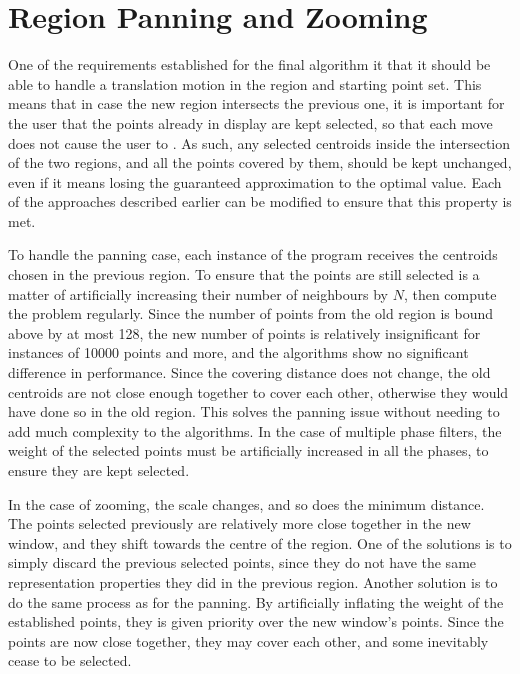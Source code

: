 \section{Region Panning and Zooming}
\begin{change}
One of the requirements established for the final algorithm it that it should be able to handle a translation motion in the region and starting point set. This means that in case the new region intersects the previous one, it is important for the user that the points already in display are kept selected, so that each move does not cause the user to . As such, any selected centroids inside the intersection of the two regions, and all the points covered by them, should be kept unchanged, even if it means losing the guaranteed approximation to the optimal value. Each of the approaches described earlier can be modified to ensure that this property is met. 

To handle the panning case, each instance of the program receives the centroids chosen in the previous region. To ensure that the points are still selected is a matter of artificially increasing their number of neighbours by $N$, then compute the problem regularly.  Since the number of points from the old region is bound above by at most 128, the new number of points is relatively insignificant for instances of 10000 points and more, and the algorithms show no significant difference in performance. Since the covering distance does not change, the old centroids are not close enough together to cover each other, otherwise they would have done so in the old region. This solves the panning issue without needing to add much complexity to the algorithms. In the case of multiple phase filters, the weight of the selected points must be artificially increased in all the phases, to ensure they are kept selected.



In the case of zooming, the scale changes, and so does the minimum distance. The points selected previously are relatively more close together in the new window, and they shift towards the centre of the region. One of the solutions is to simply discard the previous selected points, since they do not have the same representation properties they did in the previous region. Another solution is to do the same process as for the panning. By artificially inflating the weight of the established points, they is given priority over the new window's points. Since the points are now close together, they may cover each other, and some inevitably cease to be selected.


\end{change}
